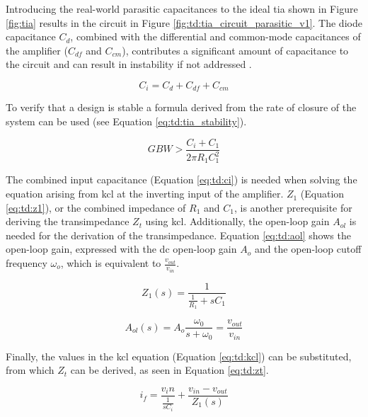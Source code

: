 Introducing the real-world parasitic capacitances to the ideal \gls{tia} shown in Figure \ref{fig:tia} results in the circuit in Figure \ref{fig:td:tia_circuit_parasitic_v1}. The diode capacitance $C_d$, combined with the differential and common-mode capacitances of the amplifier ($C_{df}$ and $C_{cm}$), contributes a significant amount of capacitance to the circuit and can result in instability if not addressed \cite{cherian2016you}.

\begin{equation}\label{eq:td:ci}
	C_i = C_{d} + C_{df} + C_{cm}
\end{equation}

To verify that a design is stable a formula derived from the rate of closure of the system can be used \cite{ti2019simplify} (see Equation \eqref{eq:td:tia_stability}).

\begin{equation}\label{eq:td:tia_stability}
	GBW > \frac{C_i + C_1}{2\pi R_1C_1^2}
\end{equation}

The combined input capacitance (Equation \eqref{eq:td:ci}) is needed when solving the equation arising from \gls{kcl} at the inverting input of the amplifier. $Z_1$ (Equation \eqref{eq:td:z1}), or the combined impedance of $R_1$ and $C_1$, is another prerequisite for deriving the transimpedance $Z_t$ using \gls{kcl}. Additionally, the open-loop gain $A_{ol}$ is needed for the derivation of the transimpedance. Equation \eqref{eq:td:aol} shows the open-loop gain, expressed with the \gls{dc} open-loop gain $A_o$ and the open-loop cutoff frequency $\omega_o$, which is equivalent to $\frac{v_{out}}{v_{in}}$.

\begin{equation}\label{eq:td:z1}
	Z_1(s) = \frac{1}{\frac{1}{R_1} + sC_1}
\end{equation}

\begin{equation}\label{eq:td:aol}
	A_{ol}(s) = A_o\frac{\omega_0}{s + \omega_0} = \frac{v_{out}}{v_{in}}
\end{equation}

Finally, the values in the \gls{kcl} equation (Equation \eqref{eq:td:kcl}) can be substituted, from which $Z_t$ can be derived, as seen in Equation \eqref{eq:td:zt}. 

\begin{equation}\label{eq:td:kcl}
	i_f = \frac{v_in}{\frac{1}{sC_i}} + \frac{v_{in} - v_{out}}{Z_1(s)}
\end{equation}

